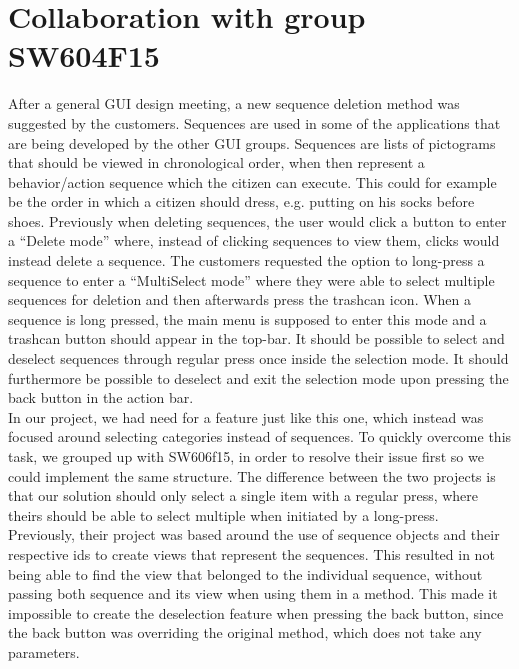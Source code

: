\section{Collaboration with group SW604F15}
\label{sec:collaboration_with_group_sw604f15}

After a general GUI design meeting, a new sequence deletion method was suggested by the customers. Sequences are used in some of the applications that are being developed by the other GUI groups. Sequences are lists of pictograms that should be viewed in chronological order, when then represent a behavior/action sequence which the citizen can execute. This could for example be the order in which a citizen should dress, e.g. putting on his socks before shoes. Previously when deleting sequences, the user would click a button to enter a ``Delete mode'' where, instead of clicking sequences to view them, clicks would instead delete a sequence. The customers requested the option to long-press a sequence to enter a ``MultiSelect mode'' where they were able to select multiple sequences for deletion and then afterwards press the trashcan icon. When a sequence is long pressed, the main menu is supposed to enter this mode and a trashcan button should appear in the top-bar. It should be possible to select and deselect sequences through regular press once inside the selection mode. It should furthermore be possible to deselect and exit the selection mode upon pressing the back button in the action bar.\\

In our project, we had need for a feature just like this one, which instead was focused around selecting categories instead of sequences. To quickly overcome this task, we grouped up with SW606f15, in order to resolve their issue first so we could implement the same structure. The difference between the two projects is that our solution should only select a single item with a regular press, where theirs should be able to select multiple when initiated by a long-press. \\
 
Previously, their project was based around the use of sequence objects and their respective ids to create views that represent the sequences. This resulted in not being able to find the view that belonged to the individual sequence, without passing both sequence and its view when using them in a method. This made it impossible to create the deselection feature when pressing the back button, since the back button was overriding the original  method, which does not take any parameters. \\
 
